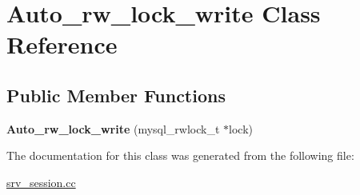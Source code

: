 \hypertarget{classAuto__rw__lock__write}{}\section{Auto\+\_\+rw\+\_\+lock\+\_\+write Class Reference}
\label{classAuto__rw__lock__write}
\subsection*{Public Member Functions}
\begin{DoxyCompactItemize}
\item 
\mbox{\label{classAuto__rw__lock__write_a53540ad4f13fb0f8e7d99a1dbaf08acf}} 
{\bfseries Auto\+\_\+rw\+\_\+lock\+\_\+write} (mysql\+\_\+rwlock\+\_\+t $\ast$lock)
\end{DoxyCompactItemize}


The documentation for this class was generated from the following file\+:\begin{DoxyCompactItemize}
\item 
\mbox{\hyperlink{srv__session_8cc}{srv\+\_\+session.\+cc}}\end{DoxyCompactItemize}
